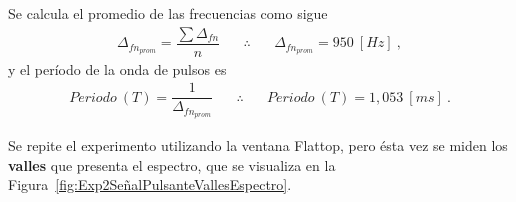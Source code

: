       Se calcula el promedio de las frecuencias como sigue
      \begin{align*}
        \Delta_{fn_{prom}}=\dfrac{\sum{\Delta_{fn}}}{n} \hspace{20pt} \therefore \hspace{20pt} \boxed{\Delta_{fn_{prom}}=950~[Hz]}~,
      \end{align*}
      y el período de la onda de pulsos es 
      \begin{align*}
        Periodo~\left( T \right)=\dfrac{1}{\Delta_{fn_{prom}}} \hspace{20pt} \therefore \hspace{20pt} \boxed{Periodo~\left( T \right)=1,053~[ms]}~.
      \end{align*}

        Se repite el experimento utilizando la ventana Flattop, pero ésta vez se miden los 
        \textbf{valles} que presenta el espectro, que se visualiza en la 
        Figura~\ref{fig:Exp2SeñalPulsanteVallesEspectro}.

